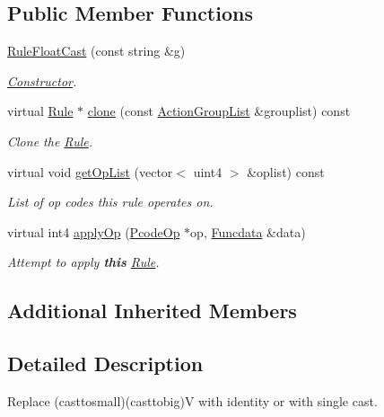 \subsection*{Public Member Functions}
\begin{DoxyCompactItemize}
\item 
\mbox{\hyperlink{class_rule_float_cast_a5b48a32e37d7737d898b0e7de198890e}{Rule\+Float\+Cast}} (const string \&g)
\begin{DoxyCompactList}\small\item\em \mbox{\hyperlink{class_constructor}{Constructor}}. \end{DoxyCompactList}\item 
virtual \mbox{\hyperlink{class_rule}{Rule}} $\ast$ \mbox{\hyperlink{class_rule_float_cast_ad95f614c4d32b7ec4ce070dff4f4b0d1}{clone}} (const \mbox{\hyperlink{class_action_group_list}{Action\+Group\+List}} \&grouplist) const
\begin{DoxyCompactList}\small\item\em Clone the \mbox{\hyperlink{class_rule}{Rule}}. \end{DoxyCompactList}\item 
virtual void \mbox{\hyperlink{class_rule_float_cast_ae1aff01fafb453226d7e4e8a7bf7faaa}{get\+Op\+List}} (vector$<$ uint4 $>$ \&oplist) const
\begin{DoxyCompactList}\small\item\em List of op codes this rule operates on. \end{DoxyCompactList}\item 
virtual int4 \mbox{\hyperlink{class_rule_float_cast_aa220e61357bdc27e129e2f2dda089c1f}{apply\+Op}} (\mbox{\hyperlink{class_pcode_op}{Pcode\+Op}} $\ast$op, \mbox{\hyperlink{class_funcdata}{Funcdata}} \&data)
\begin{DoxyCompactList}\small\item\em Attempt to apply {\bfseries{this}} \mbox{\hyperlink{class_rule}{Rule}}. \end{DoxyCompactList}\end{DoxyCompactItemize}
\subsection*{Additional Inherited Members}


\subsection{Detailed Description}
Replace (casttosmall)(casttobig)V with identity or with single cast. 

